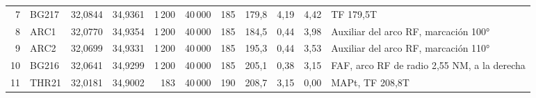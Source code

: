 \begin{longtable}{rlrrrrrrrr>{\raggedright\arraybackslash}p{3.4cm}}
7 & BG217 & 32,0844 & 34,9361 & 1\,200 & 40\,000 & 185 & 179,8 & 4,19 & 4,42 & \scriptsize TF 179,5T\\
8 & ARC1 & 32,0770 & 34,9354 & 1\,200 & 40\,000 & 185 & 184,5 & 0,44 & 3,98 & \scriptsize Auxiliar del arco RF, marcación 100°\\
9 & ARC2 & 32,0699 & 34,9331 & 1\,200 & 40\,000 & 185 & 195,3 & 0,44 & 3,53 & \scriptsize Auxiliar del arco RF, marcación 110°\\
10 & BG216 & 32,0641 & 34,9299 & 1\,200 & 40\,000 & 185 & 205,1 & 0,38 & 3,15 & \scriptsize FAF, arco RF de radio 2,55 NM, a la derecha\\
11 & THR21 & 32,0181 & 34,9002 & 183 & 40\,000 & 190 & 208,7 & 3,15 & 0,00 & \scriptsize MAPt, TF 208,8T\\
\end{longtable}
\endgroup
